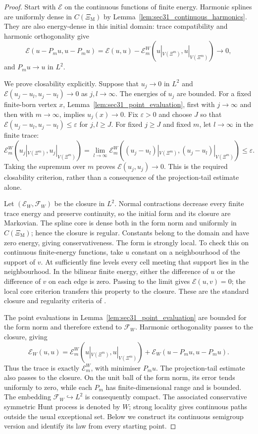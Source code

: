 \documentclass{article}
\theoremstyle{plain}
\theoremstyle{definition}
\begin{document}
\begingroup\color{red}
\begin{proof}
Start with $\mathcal E$ on the continuous functions of finite energy.
Harmonic splines are uniformly dense in $C(\Xi_{\mathrm M})$ by
Lemma~\ref{lem:sec31_continuous_harmonics}. They are also energy-dense in
this initial domain: trace compatibility and harmonic orthogonality give
\[
\mathcal E(u-P_m u,u-P_m u)
=\mathcal E(u,u)-\mathcal E_m^W(u|_{V(\Xi^m)},u|_{V(\Xi^m)})\longrightarrow0,
\]
and $P_m u\to u$ in $L^2$.

We prove closability explicitly. Suppose that $u_j\to0$ in $L^2$ and
$\mathcal E(u_j-u_l,u_j-u_l)\to0$ as $j,l\to\infty$.
The energies of $u_j$ are bounded. For a fixed finite-born vertex $x$,
Lemma~\ref{lem:sec31_point_evaluation}, first with $j\to\infty$ and then
with $m\to\infty$, implies $u_j(x)\to0$.
Fix $\varepsilon>0$ and choose $J$ so that
$\mathcal E(u_j-u_l,u_j-u_l)\le\varepsilon$ for $j,l\ge J$.
For fixed $j\ge J$ and fixed $m$, let $l\to\infty$ in the finite trace:
\[
\mathcal E_m^W(u_j|_{V(\Xi^m)},u_j|_{V(\Xi^m)})
=\lim_{l\to\infty}\mathcal E_m^W((u_j-u_l)|_{V(\Xi^m)},(u_j-u_l)|_{V(\Xi^m)})
\le\varepsilon.
\]
Taking the supremum over $m$ proves $\mathcal E(u_j,u_j)\to0$.
This is the required closability criterion, rather than a consequence of
the projection-tail estimate alone.

Let $(\mathcal E_W,\mathcal F_W)$ be the closure in $L^2$.
Normal contractions decrease every finite trace energy and preserve
continuity, so the initial form and its closure are Markovian.
The spline core is dense both in the form norm and uniformly in
$C(\Xi_{\mathrm M})$; hence the closure is regular.
Constants belong to the domain and have zero energy, giving conservativeness.
The form is strongly local. To check this on continuous finite-energy
functions, take $u$ constant on a neighbourhood of the support of $v$.
At sufficiently fine levels every cell meeting that support lies in the
neighbourhood. In the bilinear finite energy, either the difference of $u$
or the difference of $v$ on each edge is zero. Passing to the limit gives
$\mathcal E(u,v)=0$; the local core criterion transfers this property to
the closure. These are the standard closure and regularity criteria of
\cite{fukushima1994dirichlet}.

The point evaluations in Lemma~\ref{lem:sec31_point_evaluation} are bounded
for the form norm and therefore extend to $\mathcal F_W$.
Harmonic orthogonality passes to the closure, giving
\[
\mathcal E_W(u,u)=\mathcal E_m^W(u|_{V(\Xi^m)},u|_{V(\Xi^m)})
 +\mathcal E_W(u-P_m u,u-P_m u).
\]
Thus the trace is exactly $\mathcal E_m^W$, with minimiser $P_m u$.
The projection-tail estimate also passes to the closure. On the unit ball
of the form norm, its error tends uniformly to zero, while each $P_m$
has finite-dimensional range and is bounded. The embedding
$\mathcal F_W\hookrightarrow L^2$ is consequently compact.
The associated conservative symmetric Hunt process is denoted by $W$;
strong locality gives continuous paths outside the usual exceptional set.
Below we construct its continuous semigroup version and identify its law
from every starting point.
\end{proof}
\endgroup{}
\end{document}
